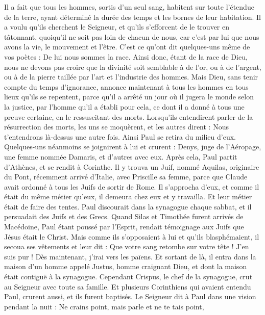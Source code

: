 \begin{multicols}{2}
Il a fait que tous les hommes, sortis d’un seul sang, habitent sur toute l'étendue de la terre, ayant déterminé la durée des temps et les bornes de leur habitation.
Il a voulu qu'ils cherchent le Seigneur, et qu’ils s’efforcent de le trouver en tâtonnant, quoiqu'il ne soit pas loin de chacun de nous,
car c’est par lui que nous avons la vie, le mouvement et l'être. C’est ce qu’ont dit quelques-uns même de vos poètes : De lui nous sommes la race.
Ainsi donc, étant de la race de Dieu, nous ne devons pas croire que la divinité soit semblable à de l'or, ou à de l'argent, ou à de la pierre taillée par l'art et l'industrie des hommes.
Mais Dieu, sans tenir compte du temps d’ignorance, annonce maintenant à tous les hommes en tous lieux qu'ils se repentent,
parce qu'il a arrêté un jour où il jugera le monde selon la justice, par l'homme qu'il a établi pour cela, ce dont il a donné à tous une preuve certaine, en le ressuscitant des morts.
Lorsqu’ils entendirent parler de la résurrection des morts, les uns se moquèrent, et les autres dirent : Nous t'entendrons là-dessus une autre fois.
Ainsi Paul se retira du milieu d'eux.
Quelques-uns néanmoins se joignirent à lui et crurent : Denys, juge de l’Aéropage, une femme nommée Damaris, et d’autres avec eux.
\VerseOne{}Après cela, Paul partit d'Athènes, et se rendit à Corinthe.
Il y trouva un Juif, nommé Aquilas, originaire du Pont, récemment arrivé d'Italie, avec Priscille sa femme, parce que Claude avait ordonné à tous les Juifs de sortir de Rome. Il s’approcha d’eux,
et comme il était du même métier qu’eux, il demeura chez eux et y travailla. Et leur métier était de faire des tentes.
Paul discourait dans la synagogue chaque sabbat, et il persuadait des Juifs et des Grecs.
Quand Silas et Timothée furent arrivés de Macédoine, Paul étant poussé par l'Esprit, rendait témoignage aux Juifs que Jésus était le Christ.
Mais comme ils s’opposaient à lui et qu'ils blasphémaient, il secoua ses vêtements et leur dit : Que votre sang retombe sur votre tête ! J’en suis pur ! Dès maintenant, j’irai vers les païens.
Et sortant de là, il entra dans la maison d'un homme appelé Justus, homme craignant Dieu, et dont la maison était contiguë à la synagogue.
Cependant Crispus, le chef de la synagogue, crut au Seigneur avec toute sa famille. Et plusieurs Corinthiens qui avaient entendu Paul, crurent aussi, et ils furent baptisés.
Le Seigneur dit à Paul dans une vision pendant la nuit : Ne crains point, mais parle et ne te tais point,

\end{multicols}
